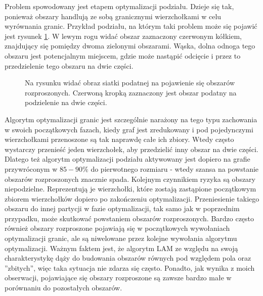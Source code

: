 Problem spowodowany jest etapem optymalizacji podziału.
Dzieje się tak, ponieważ obszary handlują ze sobą granicznymi wierzchołkami w celu wyrównania granic.
Przykład podziału, na którym taki problem może się pojawić jest rysunek \ref{im:noises_2}.
W lewym rogu widać obszar zaznaczony czerwonym kółkiem, znajdujący się pomiędzy dwoma zielonymi obszarami.
Wąska, dolna odnoga tego obszaru jest potencjalnym miejscem, gdzie może nastąpić
odcięcie i przez to przedzielenie tego obszaru na dwie części.

\begin{figure}[h]
\centering
{}
\caption{Na rysunku widać obraz siatki podatnej na pojawienie się obszarów rozproszonych. Czerwoną kropką zaznaczony jest obszar podatny
na podzielenie na dwie części.}
\label{im:noises_2}
\end{figure}

Algorytm optymalizacji granic jest szczególnie narażony na tego typu zachowania w swoich początkowych fazach,
kiedy graf jest zredukowany i pod pojedynczymi wierzchołkami przenoszone są tak naprawdę całe ich zbiory.
Wtedy często wystarczy przenieść jeden wierzchołek, aby przedzielić inny obszar na dwie części.
Dlatego też algorytm optymalizacji podziału aktywowany jest dopiero na grafie przywróconym w $85-90\%$ do
pierwotnego rozmiaru - wtedy szansa na powstanie obszarów rozproszonych znacznie spada.
Kolejnym czynnikiem ryzyka są obszary niepodzielne.
Reprezentują je wierzchołki, które zostają zastąpione początkowym zbiorem wierzchołków
dopiero po zakończeniu optymalizacji.
Przeniesienie takiego obszaru do innej partycji w fazie optymalizacji, tak samo jak w poprzednim przypadku, może skutkować
powstaniem obszarów rozproszonych.
Bardzo często również obszary rozproszone pojawiają się w początkowych wywołaniach optymalizacji granic, ale są niwelowane przez
kolejne wywołania algorytmu optymalizacji.
Ważnym faktem jest, że algorytm LAM ze względu na swoją charakterystykę dąży do budowania obszarów równych pod względem
pola oraz ''zbitych'', więc taka sytuacja nie zdarza się często.
Ponadto, jak wynika z moich obserwacji, pojawiające się obszary rozproszone są zawsze bardzo małe w
porównaniu do pozostałych obszarów.

